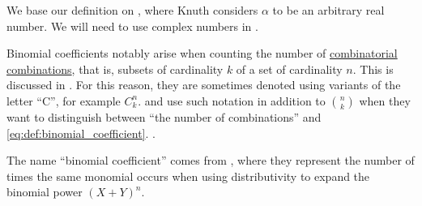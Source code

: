 \begin{comments}
  \item We base our definition on \cite[53]{Knuth1997ArtVol1}, where Knuth considers \( \alpha \) to be an arbitrary real number. We will need to use complex numbers in .

  \item Binomial coefficients notably arise when counting the number of \hyperref[def:combinatorial_combination]{combinatorial combinations}, that is, subsets of cardinality \( k \) of a set of cardinality \( n \). This is discussed in . For this reason, they are sometimes denoted using variants of the letter \enquote{C}, for example \( C_k^n \).  and  use such notation in addition to \( \binom n k \) when they want to distinguish between \enquote{the number of combinations} and \eqref{eq:def:binomial_coefficient}.
  .

  \item The name \enquote{binomial coefficient} comes from , where they represent the number of times the same monomial occurs when using distributivity to expand the binomial power \( (X + Y)^n \).
\end{comments}

